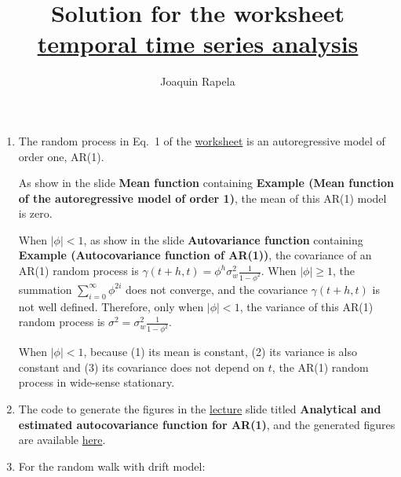 \documentclass[12pt]{article}
\title{Solution for the worksheet
\href{https://github.com/joacorapela/statNeuro2025/blob/master/worksheets/01_temporalTimeSeriesAnalysis/worksheet_temporalTimeSeriesAnalysis.pdf}{temporal time series analysis}}
\author{Joaquin Rapela}
\begin{document}
\maketitle

\begin{enumerate}

    \item The random process in Eq.~1 of the
        \href{https://github.com/joacorapela/statNeuro2025/blob/master/worksheets/01_temporalTimeSeriesAnalysis/worksheet_temporalTimeSeriesAnalysis.pdf}
        {worksheet} is an autoregressive model of order one, AR(1).

        As show in the slide \textbf{Mean function} containing \textbf{Example
        (Mean function of the autoregressive model of order 1)}, the mean of this AR(1)
        model is zero.

        When $|\phi|<1$, as show in the slide \textbf{Autovariance function}
        containing \textbf{Example (Autocovariance function of AR(1))}, the
        covariance of an AR(1) random process is $\gamma(t+h,
        t)=\phi^h\sigma_w^2\frac{1}{1-\phi^2}$.
        When $|\phi|\ge 1$, the summation $\sum_{i=0}^\infty\phi^{2i}$
        does not converge, and the covariance $\gamma(t+h, t)$ is not well defined.
        Therefore, only when $|\phi|<1$,  the variance of this AR(1) random process is
        $\sigma^2=\sigma_w^2\frac{1}{1-\phi^2}$.

        When $|\phi|<1$, because (1) its mean is constant, (2) its variance is also constant and
        (3) its covariance does not depend on $t$, the AR(1) random process in
        wide-sense stationary.

    \item The code to generate the figures in the
        \href{https://github.com/joacorapela/statNeuro2025/blob/master/lectures/01_temporalTimeSeriesAnalysis/temporalTimeSeriesAnalysis.pdf}{lecture}
        slide titled \textbf{Analytical and estimated autocovariance function for AR(1)}, and the generated figures are available
        \href{https://joacorapela.github.io/statNeuro2025/auto_examples/01_temporalTimeSeriesAnalysis/plot_autoregressiveAutocovariance.html#sphx-glr-auto-examples-01-temporaltimeseriesanalysis-plot-autoregressiveautocovariance-py}{here}.

    \item For the random walk with drift model:

        \begin{enumerate}[(a)]


\end{enumerate}
\end{enumerate}
\end{document}

